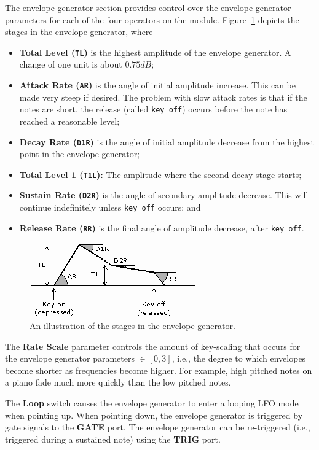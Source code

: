 \documentclass[12pt,letter]{article}
\begin{document}
The envelope generator section provides control over the envelope generator parameters for each of the four operators on the module. Figure~\ref{fig:envelope-generator} depicts the stages in the envelope generator, where
\begin{itemize}
 \item \textbf{Total Level (\texttt{TL})} is the highest amplitude of the envelope generator. A change of one unit is about $0.75dB$;
 \item \textbf{Attack Rate (\texttt{AR})} is the angle of initial amplitude increase. This can be made very steep if desired. The problem with slow attack rates is that if the notes are short, the release (called \texttt{key off}) occurs before the note has reached a reasonable level;
 \item \textbf{Decay Rate (\texttt{D1R})} is the angle of initial amplitude decrease from the highest point in the envelope generator;
 \item \textbf{Total Level 1 (\texttt{T1L}):} The amplitude where the second decay stage starts;
 \item \textbf{Sustain Rate (\texttt{D2R})} is the angle of secondary amplitude decrease. This will continue indefinitely unless \texttt{key off} occurs; and
 \item \textbf{Release Rate (\texttt{RR})} is the final angle of amplitude decrease, after \texttt{key off}.
\end{itemize}

\begin{figure}[!htp]
\centering
\caption{An illustration of the stages in the envelope generator.}
\label{fig:envelope-generator}
\includegraphics[width=\maxwidth{\textwidth}]{img/envelope}
\end{figure}

The \textbf{Rate Scale} parameter controls the amount of key-scaling that occurs for the envelope generator parameters $\in [0, 3]$, i.e., the degree to which envelopes become shorter as frequencies become higher. For example, high pitched notes on a piano fade much more quickly than the low pitched notes.

The \textbf{Loop} switch causes the envelope generator to enter a looping LFO mode when pointing up. When pointing down, the envelope generator is triggered by gate signals to the \textbf{GATE} port. The envelope generator can be re-triggered (i.e., triggered during a sustained note) using the \textbf{TRIG} port.
\end{document}
